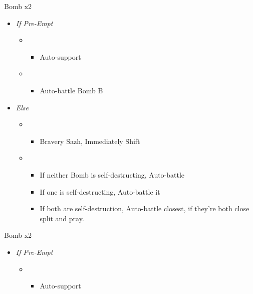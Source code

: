 \begin{paracol}{2}
	\begin{battle}{Bomb x2}
		\begin{itemize}
			\item \textit{If Pre-Empt}
			      \begin{itemize}
				      \item \second
				            \begin{itemize}
					            \item Auto-support
				            \end{itemize}
				      \item \first
				            \begin{itemize}
					            \item Auto-battle Bomb B
				            \end{itemize}
			      \end{itemize}
			\item \textit{Else}
			      \begin{itemize}
				      \item \second
				            \begin{itemize}
					            \item Bravery Sazh, Immediately Shift
				            \end{itemize}
				      \item \first
				            \begin{itemize}
					            \item If neither Bomb is self-destructing, Auto-battle
					            \item If one is self-destructing, Auto-battle it
					            \item If both are self-destruction, Auto-battle closest, if they're both close split and pray.
				            \end{itemize}
			      \end{itemize}
		\end{itemize}
	\end{battle}
	\switchcolumn
	\begin{battle}{Bomb x2}
		\begin{itemize}
			\item \textit{If Pre-Empt}
			      \begin{itemize}
				      \item \second
				            \begin{itemize}
					            \item Auto-support
				            \end{itemize}

\end{itemize}
\end{itemize}
\end{battle}
\end{paracol}
